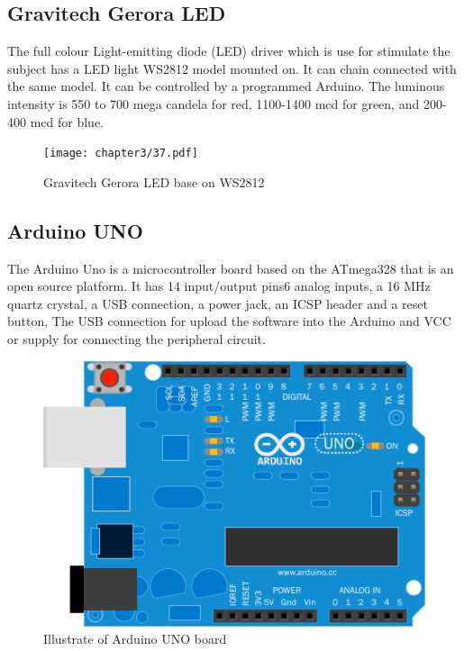 \subsection{Gravitech Gerora LED\cite{ref13}}

\hspace{1.5cm} The full colour Light-emitting diode (LED) driver which is use for stimulate the subject has a LED light WS2812 model mounted on. It can chain connected with the same model. It can be controlled by a programmed Arduino. The luminous intensity is 550 to 700 mega candela for red, 1100-1400 mcd for green, and 200-400 mcd for blue.
\begin{figure}[h]
	\centering
	\texttt{[image: chapter3/37.pdf]}
	\caption{Gravitech Gerora LED base on WS2812}
\end{figure}
\subsection{Arduino UNO\cite{ref14}}

\hspace{1.5cm} The Arduino Uno is a microcontroller board based on the ATmega328 that is an open source platform. It has 14 input/output pins6 analog inputs, a 16 MHz quartz crystal, a USB connection, a power jack, an ICSP header and a reset button, The USB connection for upload the software into the Arduino and VCC or supply for connecting the peripheral circuit.   
\begin{figure}[h]
	\centering
	\includegraphics[scale = 0.6]{chapter3/38.pdf}
	\caption{Illustrate of Arduino UNO board}
\end{figure}



